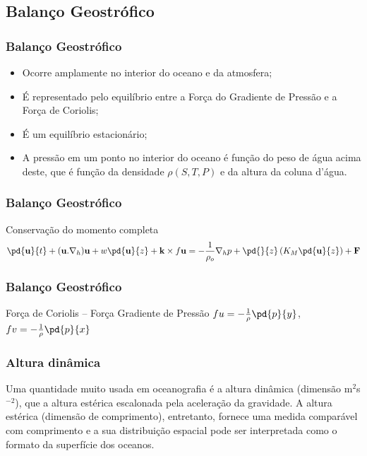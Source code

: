 \subsection{Balanço Geostrófico}
\begin{frame}
  \frametitle{Balanço Geostrófico}
  \begin{itemize}[<+-| alert@+>]
    \item Ocorre amplamente no interior do oceano e da atmosfera;
    \item É representado pelo equilíbrio entre a Força do Gradiente de Pressão
          e a Força de Coriolis;
    \item É um equilíbrio estacionário;
    \item A pressão em um ponto no interior do oceano é função do peso de água
          acima deste, que é função da densidade $\rho(S, T, P)$ e da altura da
          coluna d'água.
  \end{itemize}
\end{frame}

\begin{frame}
  \frametitle{Balanço Geostrófico}
  \small{
  \begin{block}{Conservação do momento completa}
    \[
       \pd{\mathbf{u}}{t} + (\mathbf{u}.\nabla_h)\mathbf{u} +
       w\pd{\mathbf{u}}{z} + \mathbf{k} \times f\mathbf{u} = -
       \frac{1}{\rho_o}\nabla_hp + \pd{}{z}\left(K_M\pd{\mathbf{u}}{z}\right) +
       \mathbf{F}
    \]
  \end{block}
  }
\end{frame}

\begin{frame}
  \frametitle{Balanço Geostrófico}
  \begin{block}{Força de Coriolis -- Força Gradiente de Pressão}
    \hspace{1cm} \( fu = -\frac{1}{\rho}\pd{p}{y} \), \hspace{0.5cm} \( fv = -\frac{1}{\rho}\pd{p}{x} \)
  \end{block}
\end{frame}


\begin{frame}
 \frametitle{Altura dinâmica}
 \begin{block}{}
   Uma quantidade muito usada em oceanografia é a altura dinâmica
   (dimensão m$^2$s$^{-2}$), que a altura estérica escalonada pela
   aceleração da gravidade.  A altura estérica (dimensão de
   comprimento), entretanto,  fornece uma medida comparável com
   comprimento e a sua distribuição espacial pode ser interpretada como
   o formato da superfície dos oceanos.
 \end{block}
\end{frame}

